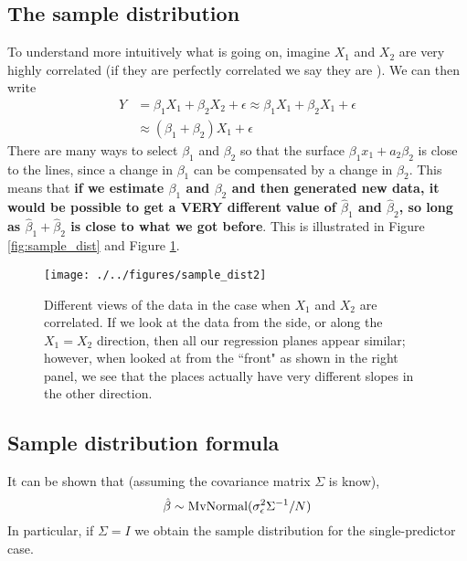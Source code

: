 \subsection{The sample distribution}

To understand more intuitively what is going on, imagine $X_1$ and $X_2$ are very highly correlated (if they are perfectly correlated we say they are ). We can then write 
\begin{align*}
Y &= \beta_1X_1 + \beta_2X_2 + \epsilon  \approx \beta_1X_1 + \beta_2X_1 + \epsilon\\
 &\approx (\beta_1+\beta_2)X_1 + \epsilon
\end{align*}
There are many ways to select $\beta_1$ and $\beta_2$ so that the surface $\beta_1x_1+a_2\beta_2$ is close to the lines, since a change in $\beta_1$ can be compensated by a change in $\beta_2$. This means that {\bf if we estimate $\beta_1$ and $\beta_2$ and then generated new data, it would be possible to get a VERY different value of $\hat{\beta}_1$ and $\hat{\beta}_2$, so long as $\hat{\beta}_1 + \hat{\beta}_2$ is close to what we got before}. This is illustrated in Figure \ref{fig:sample_dist} and Figure \ref{fig:sample_dist2}. 

\begin{figure}[h]
    \centering
    \texttt{[image: ./../figures/sample\_dist2]}
    \caption{Different views of the data in the case when $X_1$ and $X_2$ are correlated. If we look at the data from the side, or along the $X_1=X_2$ direction, then all our regression planes appear similar; however, when looked at from the ``front" as shown in the right panel, we see that the places actually have very different slopes in the other direction.  }
    \label{fig:sample_dist2}
\end{figure}

\subsection{Sample distribution formula}

It can be shown that (assuming the covariance matrix $\Sigma$ is know), 
\begin{equation}
\hat{\beta} \sim {\rm MvNormal}(\sigma_{\epsilon}^2 \Sigma^{-1}/N)
\end{equation}
In particular, if $\Sigma =I$ we obtain the sample distribution for the single-predictor case. 





